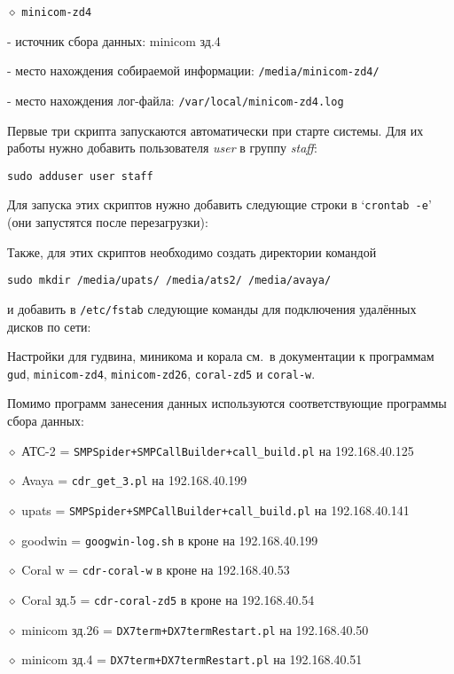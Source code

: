 \noindent $\diamond$ {\tt minicom-zd4}
\item{} - источник сбора данных: minicom зд.4
\item{} - место нахождения собираемой информации: {\tt /media/minicom-zd4/}
\item{} - место нахождения лог-файла: {\tt /var/local/minicom-zd4.log}
\bigskip

\noindent
Первые три скрипта запускаются автоматически при старте системы.
Для их работы нужно добавить пользователя {\sl user\/} в
группу {\sl staff\/}: \hfil\break
\centerline{\tt sudo adduser user staff}
\medskip

\noindent
Для запуска этих скриптов нужно добавить следующие строки в `{\tt crontab -e}'
(они запустятся после перезагрузки): \hfil\break
{} \hfil\break
{} \hfil\break
{} \par
\medskip

\noindent
Также, для этих скриптов необходимо создать директории командой \hfil\break
\centerline{\tt sudo mkdir /media/upats/ /media/ats2/ /media/avaya/}
и добавить в {\tt /etc/fstab} следующие команды для подключения удалённых дисков
по сети: \par
{} \hfil\break
{} \hfil\break
{}\par
\medskip

\noindent
Настройки для гудвина, миникома и корала см.\ в документации к программам {\tt gud}, {\tt minicom-zd4}, {\tt minicom-zd26}, {\tt coral-zd5} и {\tt coral-w}.
\bigskip

\noindent Помимо программ занесения данных используются соответствующие программы сбора данных:

\noindent $\diamond$ АТС-2 = {\tt SMPSpider+SMPCallBuilder+call\_build.pl} на 192.168.40.125 \par
\noindent $\diamond$ Avaya = {\tt cdr\_get\_3.pl} на 192.168.40.199 \par
\noindent $\diamond$ upats = {\tt SMPSpider+SMPCallBuilder+call\_build.pl} на 192.168.40.141 \par
\noindent $\diamond$ goodwin = {\tt googwin-log.sh} в кроне на 192.168.40.199 \par
\noindent $\diamond$ Coral w = {\tt cdr-coral-w} в кроне на 192.168.40.53 \par
\noindent $\diamond$ Coral зд.5 = {\tt cdr-coral-zd5} в кроне на 192.168.40.54 \par
\noindent $\diamond$ minicom зд.26 = {\tt DX7term+DX7termRestart.pl} на 192.168.40.50 \par %
\noindent $\diamond$ minicom зд.4 = {\tt DX7term+DX7termRestart.pl} на 192.168.40.51 %

\vfill
\eject
\bye
